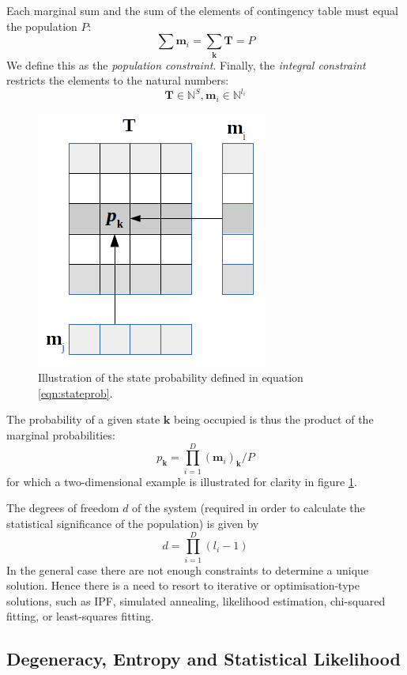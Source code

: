 \documentclass{JASSS}
\begin{document}
Each marginal sum and the sum of the elements of contingency table must
equal the population \(P\):
\begin{equation}
\sum\limits \mathbf{m}_{i} = \sum\limits_\mathbf{k} \mathbf{T} = P
\end{equation}
We define this as the \emph{population constraint}. 
Finally, the
\emph{integral constraint} restricts the elements to the natural
numbers:
\begin{equation}
{\mathbf{T} \in \mathbb{N}^S,\mathbf{m}_i} \in \mathbb{N}^{l_i}
\end{equation}

\begin{figure}[!t]
\centering
\includegraphics[width=0.35\linewidth]{figures/equation10} 
\caption{Illustration of the state probability defined in equation \ref{eqn:stateprob}.}
\label{fig:stateprob}
\end{figure}

The probability of a given state \(\mathbf{k}\) being occupied is thus
the product of the marginal probabilities:
\begin{equation}
p_{\mathbf{k}} = \prod\limits_{i=1}^{D}(\mathbf{m}_i)_\mathbf{k}/P
\label{eqn:stateprob}
\end{equation}
for which a two-dimensional example is illustrated for clarity in figure \ref{fig:stateprob}.

The degrees of freedom \(d\) of the system (required in order to
calculate the statistical significance of the population) is given by
\begin{equation}
d=\prod\limits_{i=1}^{D}(l_i-1)
\end{equation}
In the general case there are not enough constraints to determine a
unique solution. Hence there is a need to resort to iterative or
optimisation-type solutions, such as IPF, simulated annealing,
likelihood estimation, chi-squared fitting, or least-squares fitting.

\subsection{Degeneracy, Entropy and Statistical
Likelihood}\label{degeneracy-and-statistical-likelihood}
\end{document}
